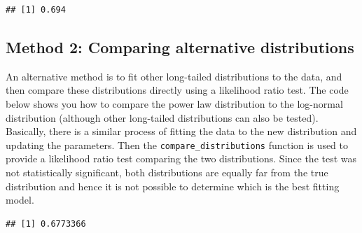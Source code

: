 \documentclass[
]{book}
\newenvironment{Shaded}{\begin{snugshade}}{\end{snugshade}}
\newcommand{\CommentTok}[1]{\textcolor[rgb]{0.56,0.35,0.01}{\textit{#1}}}
\newcommand{\DecValTok}[1]{\textcolor[rgb]{0.00,0.00,0.81}{#1}}
\newcommand{\FunctionTok}[1]{\textcolor[rgb]{0.13,0.29,0.53}{\textbf{#1}}}
\newcommand{\NormalTok}[1]{#1}
\newcommand{\OtherTok}[1]{\textcolor[rgb]{0.56,0.35,0.01}{#1}}
\newcommand{\SpecialCharTok}[1]{\textcolor[rgb]{0.81,0.36,0.00}{\textbf{#1}}}
\begin{document}
\begin{verbatim}
## [1] 0.694
\end{verbatim}

\subsection{Method 2: Comparing alternative distributions}\label{method-2-comparing-alternative-distributions}

An alternative method is to fit other long-tailed distributions to the data, and then compare these distributions directly using a likelihood ratio test. The code below shows you how to compare the power law distribution to the log-normal distribution (although other long-tailed distributions can also be tested). Basically, there is a similar process of fitting the data to the new distribution and updating the parameters. Then the \texttt{compare\_distributions} function is used to provide a likelihood ratio test comparing the two distributions. Since the test was not statistically significant, both distributions are equally far from the true distribution and hence it is not possible to determine which is the best fitting model.

\begin{Shaded}
\end{Shaded}

\begin{verbatim}
## [1] 0.6773366
\end{verbatim}
\end{document}
